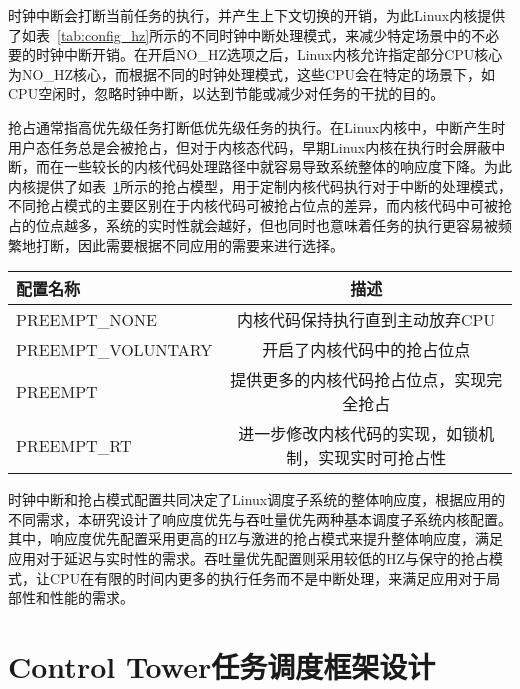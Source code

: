 时钟中断会打断当前任务的执行，并产生上下文切换的开销，为此Linux内核提供了如表~\ref{tab:config_hz}所示的不同时钟中断处理模式，来减少特定场景中的不必要的时钟中断开销。在开启NO\_HZ选项之后，Linux内核允许指定部分CPU核心为NO\_HZ核心，而根据不同的时钟处理模式，这些CPU会在特定的场景下，如CPU空闲时，忽略时钟中断，以达到节能或减少对任务的干扰的目的。

抢占通常指高优先级任务打断低优先级任务的执行。在Linux内核中，中断产生时用户态任务总是会被抢占，但对于内核态代码，早期Linux内核在执行时会屏蔽中断，而在一些较长的内核代码处理路径中就容易导致系统整体的响应度下降。为此内核提供了如表~\ref{tab:config_preempt}所示的抢占模型，用于定制内核代码执行对于中断的处理模式，不同抢占模式的主要区别在于内核代码可被抢占位点的差异，而内核代码中可被抢占的位点越多，系统的实时性就会越好，但也同时也意味着任务的执行更容易被频繁地打断，因此需要根据不同应用的需要来进行选择。

\begin{table}
    \label{tab:config_preempt}
    \footnotesize%
    \setlength{\tabcolsep}{4pt}%
    \renewcommand{\arraystretch}{1.25}%
    \centering
    \begin{tabular}{lc}
        \hline
        配置名称 & 描述 \\
        \hline
        PREEMPT\_NONE  & 内核代码保持执行直到主动放弃CPU  \\
        PREEMPT\_VOLUNTARY  & 开启了内核代码中的抢占位点 \\
        PREEMPT  & 提供更多的内核代码抢占位点，实现完全抢占 \\
        PREEMPT\_RT & 进一步修改内核代码的实现，如锁机制，实现实时可抢占性 \\
        \hline
    \end{tabular}
\end{table}

时钟中断和抢占模式配置共同决定了Linux调度子系统的整体响应度，根据应用的不同需求，本研究设计了响应度优先与吞吐量优先两种基本调度子系统内核配置。其中，响应度优先配置采用更高的HZ与激进的抢占模式来提升整体响应度，满足应用对于延迟与实时性的需求。吞吐量优先配置则采用较低的HZ与保守的抢占模式，让CPU在有限的时间内更多的执行任务而不是中断处理，来满足应用对于局部性和性能的需求。

\section{Control Tower任务调度框架设计}

